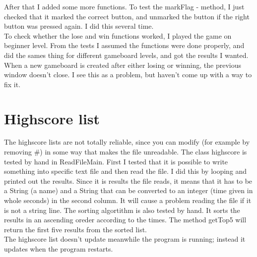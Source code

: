 \documentclass[12pt,twoside,a4paper]{article}
\begin{document}
After that I added some more functions. To test the markFlag - method, I just checked that it marked the correct button, and unmarked the button if the right button was pressed again. I did this several time. \\

To check whether the lose and win functions worked, I played the game on beginner level. From the tests I assumed the functions were done properly, and did the sames thing for different gameboard levels, and got the results I wanted. \\

When a new gameboard is created after either losing or winning, the previous window doesn't close. I see this as a problem, but haven't come up with a way to fix it. \\

\section*{Highscore list}

The highscore lists are not totally reliable, since you can modify (for example by removing \#) in some way that makes the file unreadable. The class highscore is tested by hand in ReadFileMain. First I tested that it is possible to write something into specific text file and then read the file. I did this by looping and printed out the results. Since it is results the file reads, it means that it has to be a String (a name) and a String that can be converted to an integer (time given in whole seconds) in the second column. It will cause a problem reading the file if it is not a string line. The sorting algortithm is also tested by hand. It sorts the results in an ascending oreder according to the times. The method getTop5 will return the first five results from the sorted list.  \\

The highscore list doesn't update meanwhile the program is running; instead it updates when the program restarts.
\end{document}

